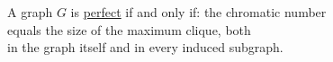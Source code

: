 \documentclass[preview]{standalone}
\begin{document}
\begin{center}
A graph $G$ is \underline{perfect} if and only if: the chromatic number \\ equals the size of the maximum clique, both\\in the graph itself and in every induced subgraph.
\end{center}
\end{document}
